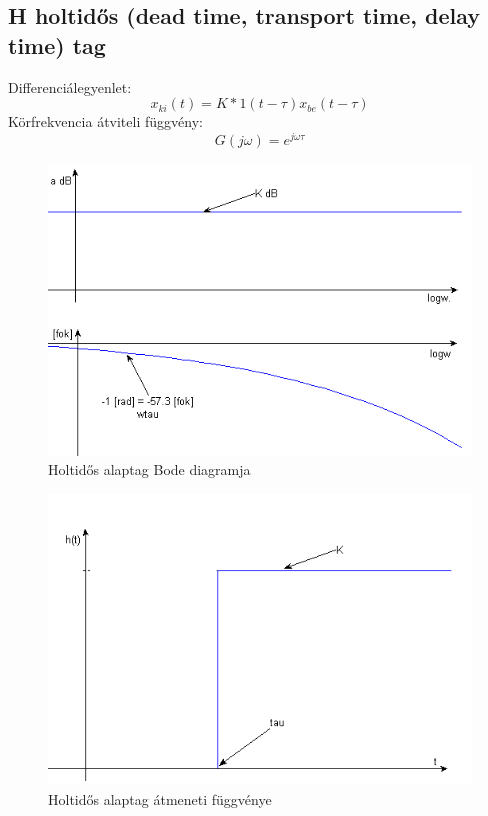 \documentclass[11pt,a4paper]{article}
\begin{document}
\subsection{H holtidős (dead time, transport time, delay time) tag}
Differenciálegyenlet:$$x_{ki}\left(t\right) = K * 1\left(t-\tau\right)x_{be}\left(t-\tau\right)$$
Körfrekvencia átviteli függvény:$$G\left(j\omega\right) = e^{j\omega\tau}$$
\begin{figure}[hbtp]
    	 \centering
		\includegraphics[scale=1.0]{30_ht1_tag_bode.png}
		\caption{Holtidős alaptag Bode diagramja}
\end{figure}
\begin{figure}[hbtp]
    	 \centering
		\includegraphics[scale=1.0]{31_ht1_tag_atmenet.png}
		\caption{Holtidős alaptag átmeneti függvénye}
\end{figure}
\newpage
\end{document}
